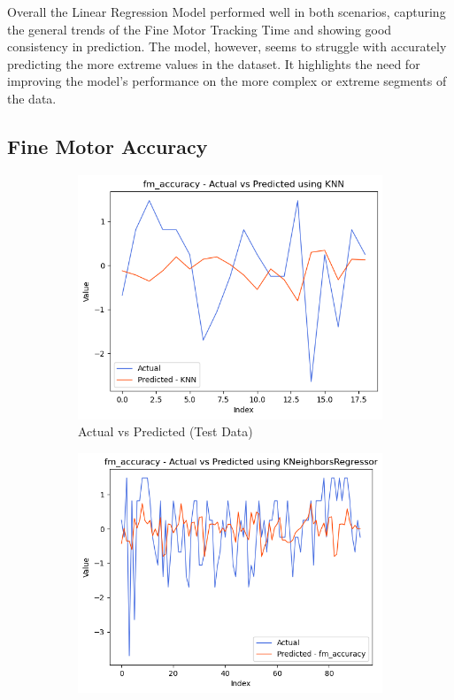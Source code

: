 Overall the Linear Regression Model performed well in both scenarios, capturing the general trends of the Fine Motor Tracking Time and showing good consistency in prediction.
The model, however, seems to struggle with accurately predicting the more extreme values in the dataset. It highlights the need for improving the model's performance on the more complex
or extreme segments of the data.

\subsection*{Fine Motor Accuracy}

\begin{figure}[htbp]
    \centering
    \begin{subfigure}[b]{0.49\textwidth}
        \centering
        \includegraphics[width=\textwidth]{images/charts/test_data_fine_motor_accuracy.png}
        \caption{Actual vs Predicted (Test Data)}
        \label{fig:actual_vs_predicted_fm_accuracy_test}
    \end{subfigure}\hfill
    \begin{subfigure}[b]{0.49\textwidth}
        \centering
        \includegraphics[width=\textwidth]{images/charts/all_data_fine_motor_accuracy.png}

\end{subfigure}
\end{figure}
